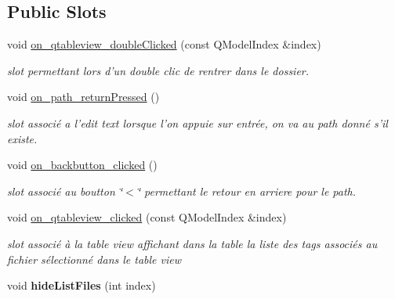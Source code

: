\subsection*{Public Slots}
\begin{DoxyCompactItemize}
\item 
void \hyperlink{classexplorerlayout_a901d318100af1524b51b0075d9626c01}{on\-\_\-qtableview\-\_\-double\-Clicked} (const Q\-Model\-Index \&index)
\begin{DoxyCompactList}\small\item\em slot permettant lors d'un double clic de rentrer dans le dossier. \end{DoxyCompactList}\item 
\hypertarget{classexplorerlayout_aa96e3819021c89ea58df68a34e599b22}{void \hyperlink{classexplorerlayout_aa96e3819021c89ea58df68a34e599b22}{on\-\_\-path\-\_\-return\-Pressed} ()}\label{classexplorerlayout_aa96e3819021c89ea58df68a34e599b22}

\begin{DoxyCompactList}\small\item\em slot associé a l'edit text lorsque l'on appuie sur entrée, on va au path donné s'il existe. \end{DoxyCompactList}\item 
\hypertarget{classexplorerlayout_ade8d3fbd3d0e61cb409191736ab844e6}{void \hyperlink{classexplorerlayout_ade8d3fbd3d0e61cb409191736ab844e6}{on\-\_\-backbutton\-\_\-clicked} ()}\label{classexplorerlayout_ade8d3fbd3d0e61cb409191736ab844e6}

\begin{DoxyCompactList}\small\item\em slot associé au boutton \char`\"{}$<$\char`\"{} permettant le retour en arriere pour le path. \end{DoxyCompactList}\item 
void \hyperlink{classexplorerlayout_afb5f67a2903743d8a8374f5160ff5d25}{on\-\_\-qtableview\-\_\-clicked} (const Q\-Model\-Index \&index)
\begin{DoxyCompactList}\small\item\em slot associé à la table view affichant dans la table la liste des tags associés au fichier sélectionné dans le table view \end{DoxyCompactList}\item 
\hypertarget{classexplorerlayout_a08d4b2c695d42645f4d29f96e90ed07f}{void {\bfseries hide\-List\-Files} (int index)}\label{classexplorerlayout_a08d4b2c695d42645f4d29f96e90ed07f}

\end{DoxyCompactItemize}
